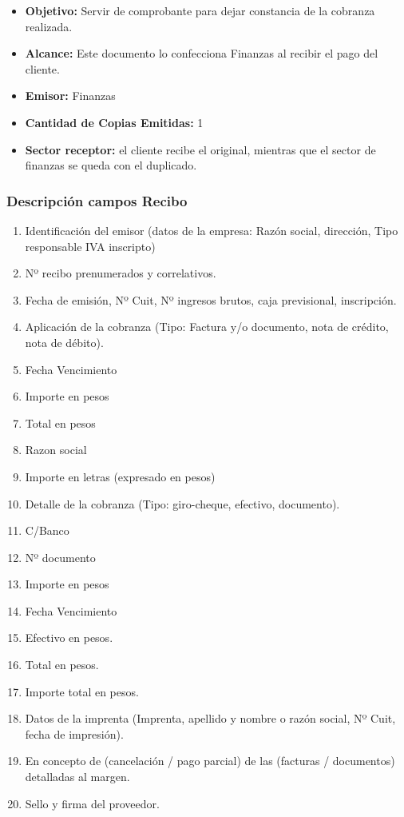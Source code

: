 \begin{itemize}
  \item \textbf{Objetivo:} Servir de comprobante para dejar constancia de la cobranza realizada.
  \item \textbf{Alcance:} Este documento lo confecciona Finanzas al recibir el pago del cliente.
  \item \textbf{Emisor:} Finanzas
  \item \textbf{Cantidad de Copias Emitidas:} 1
  \item \textbf{Sector receptor:} el cliente recibe el original, mientras que el sector de finanzas se queda con el duplicado.
 \end{itemize}
 
\subsubsection{Descripci\'on campos Recibo}
\begin{enumerate}
\item Identificación del emisor (datos de la empresa: Razón social, dirección, Tipo responsable IVA inscripto)
\item Nº recibo prenumerados y correlativos.
\item Fecha de emisión, Nº Cuit, Nº ingresos brutos, caja previsional, inscripción.
\item Aplicación de la cobranza (Tipo: Factura y/o documento, nota de crédito, nota de débito).
\item Fecha Vencimiento
\item Importe en pesos
\item Total en pesos
\item Razon social
\item Importe en letras (expresado en pesos)
\item Detalle de la cobranza (Tipo: giro-cheque, efectivo, documento).
\item C/Banco
\item Nº documento
\item Importe en pesos
\item Fecha Vencimiento
\item Efectivo en pesos.
\item Total en pesos.
\item Importe total en pesos.
\item Datos de la  imprenta (Imprenta, apellido y nombre o razón social, Nº Cuit,  fecha de impresión).
\item En concepto de (cancelación / pago  parcial) de las (facturas / documentos) detalladas al margen.
\item Sello y firma del proveedor.
\end{enumerate}


